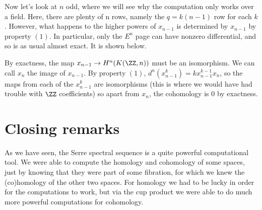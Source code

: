 \documentclass[12pt,oneside]{amsart}
\begin{document}
Now let's look at $n$ odd, where we will see why the computation only works over a field. Here, there are plenty of n rows, namely the $q = k(n-1)$ row for each $k$. However, what happens to the higher powers of $x_{n-1}$ is determined by $x_{n-1}$ by property $(1)$. In particular, only the $E^{n}$ page can have nonzero differential, and so is as usual almost exact. It is shown below.

\begin{center}
\end{center}

By exactness, the map $x_{n-1} \to H^n(K(\ZZ,n))$ must be an isomorphism. We can call $x_n$ the image of $x_{n-1}$. By property $(1)$, $d^{n}(x_{n-1}^k) = k x_{n-1}^{k-1} x_n$, so the maps from each of the $x^k_{n-1}$ are isomorphisms (this is where we would have had trouble with $\ZZ$ coefficients) so apart from $x_n$, the cohomology is $0$ by exactness.
\section{Closing remarks}

As we have seen, the Serre spectral sequence is a quite powerful computational tool. We were able to compute the homology and cohomology of some spaces, just by knowing that they were part of some fibration, for which we knew the (co)homology of the other two spaces. For homology we had to be lucky in order for the computations to work, but via the cup product we were able to do much more powerful computations for cohomology.

\printbibliography
\end{document}
